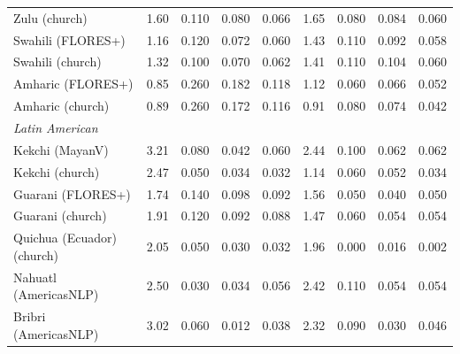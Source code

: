 \begin{table}[htbp]
\begin{tabular}{lrrrrrrrr}
Zulu (church) & 1.60 & \cellcolor{loss!25}0.110 & \cellcolor{loss!18}0.080 & \cellcolor{loss!15}0.066 & 1.65 & \cellcolor{loss!18}0.080 & \cellcolor{loss!19}0.084 & \cellcolor{loss!14}0.060 \\
Swahili (FLORES+) & 1.16 & \cellcolor{loss!28}0.120 & \cellcolor{loss!17}0.072 & \cellcolor{loss!14}0.060 & 1.43 & \cellcolor{loss!25}0.110 & \cellcolor{loss!21}0.092 & \cellcolor{loss!13}0.058 \\
Swahili (church) & 1.32 & \cellcolor{loss!23}0.100 & \cellcolor{loss!16}0.070 & \cellcolor{loss!14}0.062 & 1.41 & \cellcolor{loss!25}0.110 & \cellcolor{loss!24}0.104 & \cellcolor{loss!14}0.060 \\
Amharic (FLORES+) & 0.85 & \cellcolor{loss!60}0.260 & \cellcolor{loss!42}0.182 & \cellcolor{loss!27}0.118 & 1.12 & \cellcolor{loss!14}0.060 & \cellcolor{loss!15}0.066 & \cellcolor{loss!12}0.052 \\
Amharic (church) & 0.89 & \cellcolor{loss!60}0.260 & \cellcolor{loss!40}0.172 & \cellcolor{loss!27}0.116 & 0.91 & \cellcolor{loss!18}0.080 & \cellcolor{loss!17}0.074 & \cellcolor{loss!10}0.042 \\
\midrule \multicolumn{9}{l}{\textit{Latin American}} \\
Kekchi (MayanV) & 3.21 & \cellcolor{loss!18}0.080 & \cellcolor{loss!10}0.042 & \cellcolor{loss!14}0.060 & 2.44 & \cellcolor{loss!23}0.100 & \cellcolor{loss!14}0.062 & \cellcolor{loss!14}0.062 \\
Kekchi (church) & 2.47 & \cellcolor{loss!12}0.050 & \cellcolor{loss!8}0.034 & \cellcolor{loss!7}0.032 & 1.14 & \cellcolor{loss!14}0.060 & \cellcolor{loss!12}0.052 & \cellcolor{loss!8}0.034 \\
Guarani (FLORES+) & 1.74 & \cellcolor{loss!32}0.140 & \cellcolor{loss!23}0.098 & \cellcolor{loss!21}0.092 & 1.56 & \cellcolor{loss!12}0.050 & \cellcolor{loss!9}0.040 & \cellcolor{loss!12}0.050 \\
Guarani (church) & 1.91 & \cellcolor{loss!28}0.120 & \cellcolor{loss!21}0.092 & \cellcolor{loss!20}0.088 & 1.47 & \cellcolor{loss!14}0.060 & \cellcolor{loss!12}0.054 & \cellcolor{loss!12}0.054 \\
Quichua (Ecuador) (church) & 2.05 & \cellcolor{loss!12}0.050 & \cellcolor{loss!7}0.030 & \cellcolor{loss!7}0.032 & 1.96 & 0.000 & \cellcolor{loss!4}0.016 & \cellcolor{loss!0}0.002 \\
Nahuatl (AmericasNLP) & 2.50 & \cellcolor{loss!7}0.030 & \cellcolor{loss!8}0.034 & \cellcolor{loss!13}0.056 & 2.42 & \cellcolor{loss!25}0.110 & \cellcolor{loss!12}0.054 & \cellcolor{loss!12}0.054 \\
Bribri (AmericasNLP) & 3.02 & \cellcolor{loss!14}0.060 & \cellcolor{loss!3}0.012 & \cellcolor{loss!9}0.038 & 2.32 & \cellcolor{loss!21}0.090 & \cellcolor{loss!7}0.030 & \cellcolor{loss!11}0.046 \\
\bottomrule
\end{tabular}
\end{table}

